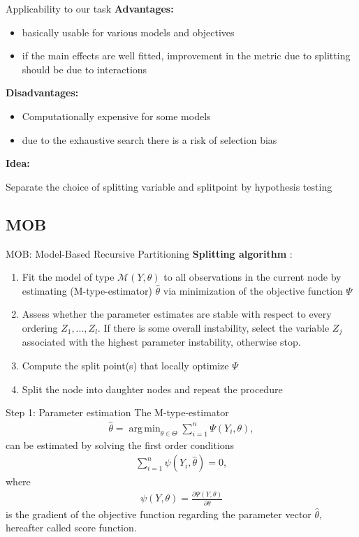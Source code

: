 \documentclass[9pt, xcolor=table]{beamer}
\DeclareMathOperator*{\argmin}{arg\,min}
\begin{document}
\begin{frame}{Applicability to our task}
\textbf{Advantages:}
\begin{itemize}
    \item basically usable for various models and objectives
    \item if the main effects are well fitted, improvement in the metric due to splitting should be due to interactions
\end{itemize}

\textbf{Disadvantages:}
\begin{itemize}
    \item Computationally expensive for some models
    \item due to the exhaustive search there is a risk of selection bias
\end{itemize}

\textbf{Idea:}

Separate the choice of splitting variable and splitpoint by hypothesis testing
    
\end{frame}


\subsection{MOB}
\begin{frame}{MOB: Model-Based Recursive Partitioning}
\textbf{Splitting algorithm} \citep{Zeileis.2008}:
\begin{enumerate}
    \item Fit the model of type $\mathcal{M}(Y, \theta)$ to all observations in the current node by estimating (M-type-estimator) $\hat{\theta}$ via minimization of the objective function $\Psi$
    \item Assess whether the parameter estimates are stable with respect to every ordering $Z_{1},..., Z_{l}$. If there is some overall instability, select the variable $Z_{j}$ associated with the highest parameter instability, otherwise stop.
    \item Compute the split point(s) that locally optimize $\Psi$
    \item Split the node into daughter nodes and repeat the procedure
\end{enumerate}
\end{frame}


\begin{frame}{Step 1: Parameter estimation}
The M-type-estimator 
\begin{align}
    \hat{\theta} = \argmin_{\theta \in \Theta} \sum_{i=1}^{n}\Psi(Y_{i}, \theta),
\end{align}
can be estimated by solving the first order conditions
\begin{align}
    \sum_{i=1}^{n}\psi(Y_{i}, \hat{\theta}) = 0,
\end{align}
where
\begin{align}
    \psi(Y,\theta) = \frac{\partial \Psi(Y,\theta)}{\partial \theta}
\end{align}
is the gradient of the objective function regarding the parameter vector $\hat{\theta}$, hereafter called score function.

\end{frame}
\end{document}
